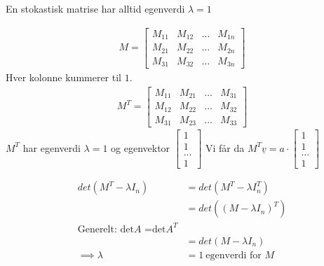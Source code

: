 \documentclass[11pt, a4paper, norsk]{article}
\begin{document}
        \begin{Theorem}{}{}
            En stokastisk matrise har alltid egenverdi $\lambda = 1$
            \begin{Proof}{}{}
                \begin{align*}
                    M = \begin{bmatrix}
                        M_{11} & M_{12} & \dots & M_{1n}
                        \\
                        M_{21} & M_{22} & \dots & M_{2n}
                        \\
                        M_{31} & M_{32} & \dots & M_{3n}
                    \end{bmatrix}
                \end{align*}
                Hver kolonne kummerer til $1$.
                \begin{align*}
                    M^T = \begin{bmatrix}
                        M_{11} & M_{21} & \dots & M_{31} \\
                        M_{12} & M_{22} & \dots & M_{32} \\
                        M_{31} & M_{23} & \dots & M_{33}
                    \end{bmatrix}
                \end{align*}
                $M^T$ har egenverdi $\lambda = 1$ og egenvektor $\begin{bmatrix}
                    1 \\
                    1 \\
                    ... \\
                    1
                \end{bmatrix}$
                Vi får da $M^{T}\underline{v} = a \cdot \begin{bmatrix}
                    1 \\
                    1 \\
                    ... \\
                    1
                \end{bmatrix}$
                
                \begin{align*}
                    det(M^{T} - \lambda I_{n}) &= det(M^{T} - \lambda I^{T}_{n})\\
                                               &= det((M - \lambda I_{n})^T)
                                               \\
                                               \text{Generelt: det$A$ =det$A^T$}
                                               \\
                                               &= det(M - \lambda I_{n})
                                               \\
                    \implies \lambda &= 1 \: \text{egenverdi for } M
                \end{align*}
            \end{Proof}
           \end{Theorem}
\end{document}
